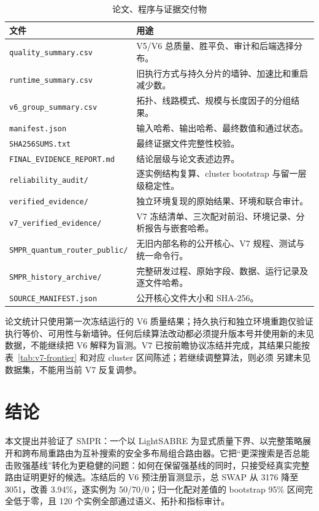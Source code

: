\documentclass[11pt,a4paper]{article}
\begin{document}
\begin{table}[H]
\centering
\small
\caption{论文、程序与证据交付物}
\label{tab:artifacts}
\begin{tabularx}{\textwidth}{p{}Y}
\toprule
文件 & 用途 \\
\midrule
\texttt{quality\_summary.csv} & V5/V6 总质量、胜平负、审计和后端选择分布。\\
\texttt{runtime\_summary.csv} & 旧执行方式与持久分片的墙钟、加速比和重启减少数。\\
\texttt{v6\_group\_summary.csv} & 拓扑、线路模式、规模与长度因子的分组结果。\\
\texttt{manifest.json} & 输入哈希、输出哈希、最终数值和通过状态。\\
\texttt{SHA256SUMS.txt} & 最终证据文件完整性校验。\\
\texttt{FINAL\_EVIDENCE\_REPORT.md} & 结论层级与论文表述边界。\\
\texttt{reliability\_audit/} & 逐实例结构复算、cluster bootstrap 与留一层级稳定性。\\
\texttt{verified\_evidence/} & 独立环境复现的原始结果、环境和联合审计。\\
\texttt{v7\_verified\_evidence/} & V7 冻结清单、三次配对前沿、环境记录、分析报告与嵌套哈希。\\
\texttt{SMPR\_quantum\_router\_public/} & 无旧内部名称的公开核心、V7 规程、测试与统一命令行。\\
\texttt{SMPR\_history\_archive/} & 完整研发过程、原始字段、数据、运行记录及逐文件哈希。\\
\texttt{SOURCE\_MANIFEST.json} & 公开核心文件大小和 SHA-256。\\
\bottomrule
\end{tabularx}
\end{table}

论文统计只使用第一次冻结运行的 V6 质量结果；持久执行和独立环境重跑仅验证
执行等价、可用性与新墙钟。任何后续算法改动都必须提升版本号并使用新的未见
数据，不能继续把 V6 解释为盲测。V7 已按前瞻协议冻结并完成，其结果只能按
表~\ref{tab:v7-frontier} 和对应 cluster 区间陈述；若继续调整算法，则必须
另建未见数据集，不能用当前 V7 反复调参。

\section{结论}

本文提出并验证了 SMPR：一个以 LightSABRE 为显式质量下界、以完整策略展开和跨布局重路由为互补搜索的安全多布局组合路由器。它把“更深搜索是否总能击败强基线”转化为更稳健的问题：如何在保留强基线的同时，只接受经真实完整路由证明更好的候选。冻结后的 V6 预注册盲测显示，总 SWAP 从 3176 降至 3051，改善 3.94\%，逐实例为 50/70/0；归一化配对差值的 bootstrap 95\% 区间完全低于零，且 120 个实例全部通过语义、拓扑和指标审计。
\end{document}
